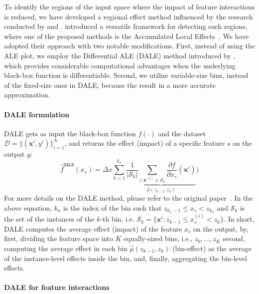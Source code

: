 \documentclass[12pt]{article}
\newcommand{\dfdx}{\frac{\partial f}{\partial x_s}}
\newcommand{\xb}{\mathbf{x}}
\begin{document}
To identify the regions of the input space where the impact of feature interactions is reduced,
we have developed a regional effect method influenced by the research conducted by
\citet{herbinger2023decomposing} and \citet{gkolemis2023dale}.
\citet{herbinger2023decomposing} introduced a versatile framework for detecting such regions,
where one of the proposed methods is the Accumulated Local Effects~\citep{apley2020visualizing}.
We have adopted their approach with two notable modifications.
First, instead of using the ALE plot, we employ the Differential ALE (DALE) method introduced by \citet{gkolemis2023dale},
which provides considerable computational advantages when the underlying black-box function is differentiable.
Second, we utilize variable-size bins, instead of the fixed-size ones in DALE, because the result in a more accurate approximation.

\paragraph{DALE formulation}

DALE gets as input the black-box function \(f(\cdot)\)
and the dataset \(\mathcal{D} = \{(\xb^i, y^i)\}_{i=1}^N\),
and returns the effect (impact) of a specific feature $s$ on the output $y$:
%
\begin{equation}  \label{eq:DALE_accumulated_mean_est}
  \hat{f}^{\mathtt{DALE}}(x_s) = \Delta x \sum_{k=1}^{k_x} \underbrace{\frac{1}{|\mathcal{S}_k|} \sum_{i:\mathbf{x}^{(i)} \in
    \mathcal{S}_k} \dfdx(\mathbf{x}^i)}_{\hat{\mu}(z_{k-1}, z_k)})
\end{equation}
%
For more details on the DALE method, please refer to the original paper~\citep{gkolemis2023dale}.
In the above equation, \(k_x\) is the index of the bin such that
\(z_{k_x-1} \leq x_s < z_{k_x} \) and \(\mathcal{S}_k\)
is the set of the instances of the \(k\)-th bin, i.e.
\( \mathcal{S}_k = \{ \xb^i : z_{k-1} \leq x^{(i)}_s < z_{k} \} \).
In short, DALE computes the average effect (impact) of the feature \(x_s\) on the output,
by, first, dividing the feature space into $K$ equally-sized bins, i.e., \(z_0, \ldots, z_K\)
second, computing the average effect in each bin \(\hat{\mu}(z_{k-1}, z_k)\) (bin-effect) as the average of the instance-level effects inside the bin,
and, finally, aggregating the bin-level effects.

\paragraph{DALE for feature interactions}
\end{document}
